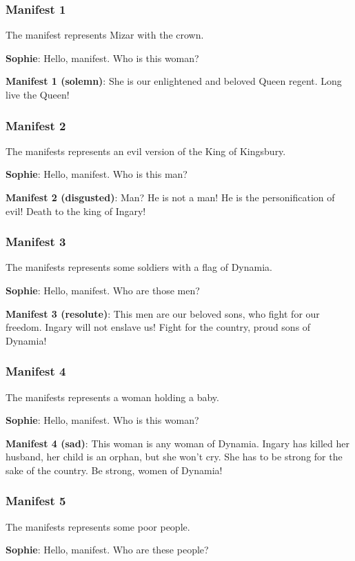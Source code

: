 \subsubsection*{Manifest 1}
The manifest represents Mizar with the crown.

\textbf{Sophie}: Hello, manifest. Who is this woman?

\textbf{Manifest 1 (solemn)}: She is our enlightened and beloved Queen regent. Long live the Queen!

\subsubsection*{Manifest 2}
The manifests represents an evil version of the King of Kingsbury.

\textbf{Sophie}: Hello, manifest. Who is this man?

\textbf{Manifest 2 (disgusted)}: Man? He is not a man! He is the personification of evil! Death to the king of Ingary!

\subsubsection*{Manifest 3}
The manifests represents some soldiers with a flag of Dynamia.

\textbf{Sophie}: Hello, manifest. Who are those men?

\textbf{Manifest 3 (resolute)}: This men are our beloved sons, who fight for our freedom. Ingary will not enslave us! Fight for the country, proud sons of Dynamia!

\subsubsection*{Manifest 4}
The manifests represents a woman holding a baby.

\textbf{Sophie}: Hello, manifest. Who is this woman?

\textbf{Manifest 4 (sad)}: This woman is any woman of Dynamia. Ingary has killed her husband, her child is an orphan, but she won't cry. She has to be strong for the sake of the country. Be strong, women of Dynamia!

\subsubsection*{Manifest 5}
The manifests represents some poor people.

\textbf{Sophie}: Hello, manifest. Who are these people?

